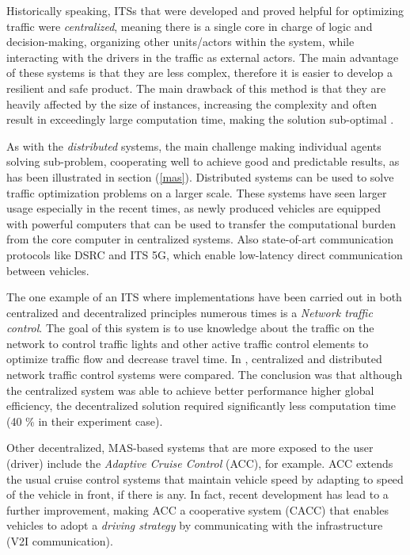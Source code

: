 \documentclass[main.tex]{subfiles}
\begin{document}
Historically speaking, ITSs that were
developed and proved helpful for optimizing traffic were \emph{centralized}, meaning there is a
single core in charge of logic and decision-making, organizing other units/actors within the
system, while interacting with the drivers in the traffic as external actors. The main
advantage of these systems is that they are less complex, therefore it is easier to develop a resilient and
safe product. The main drawback of this method is that they are heavily affected by the size
of instances, increasing the complexity and often result in exceedingly large computation time,
making the solution sub-optimal \cite{Corman2010}. 

As with the \emph{distributed} systems, the main challenge making individual agents 
solving sub-problem, cooperating well to achieve good and predictable results, as has been 
illustrated in section (\ref{mas}). Distributed systems can be used to solve traffic optimization
problems on a larger scale. These systems have seen larger usage especially in the
recent times, as newly produced vehicles are equipped with powerful computers that can be used
to transfer the computational burden from the core computer in centralized systems. Also
state-of-art communication protocols like DSRC and ITS 5G, which enable low-latency direct
communication between vehicles. 

The one example of an ITS where implementations have been carried out in both centralized and 
decentralized principles numerous times is a \emph{Network traffic control}. The goal of this 
system is to use knowledge about the traffic on the network to control traffic lights and other 
active traffic control elements to optimize traffic flow and decrease travel time. In \cite{Chow2019}, 
centralized and distributed network traffic control systems were compared. The conclusion was that 
although the centralized system was able to achieve better performance higher global efficiency, 
the decentralized solution required significantly less computation time (40 \% in their experiment case).

Other decentralized, MAS-based systems that are more exposed to the user (driver) include the 
\emph{Adaptive Cruise Control} (ACC), for example. ACC extends the usual cruise control systems 
that maintain vehicle speed by adapting to speed of the vehicle in front, if there is any. In fact, 
recent development has lead to a further improvement, making ACC a cooperative system (CACC) that 
enables vehicles to adopt a \emph{driving strategy} by communicating with the infrastructure (V2I 
communication).
\end{document}
